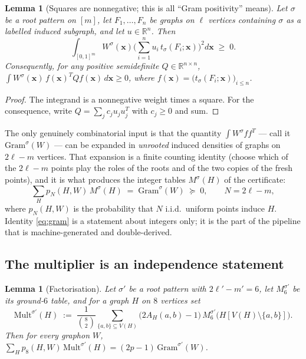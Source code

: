 \documentclass[11pt]{article}
\newtheorem{lemma}[theorem]{Lemma}
\theoremstyle{definition}
\newcommand{\R}{\mathbb R}
\begin{document}
\begin{lemma}[Squares are nonnegative; this is all ``Gram positivity'' means]
\label{lem:square}
Let $\sigma$ be a root pattern on $[m]$, let $F_1,\dots,F_n$ be graphs on
$\ell$ vertices containing $\sigma$ as a labelled induced subgraph, and let
$u\in\R^n$.  Then
\[
  \int_{[0,1]^m}W^\sigma(\mathbf x)
  \Big(\sum_{i=1}^{n}u_i\,t_\sigma(F_i;\mathbf x)\Big)^{\!2}d\mathbf x\;\ge\;0 .
\]
Consequently, for any positive semidefinite $Q\in\R^{n\times n}$,
$\int W^\sigma(\mathbf x)\,f(\mathbf x)^{T}Qf(\mathbf x)\,d\mathbf x\ge0$, where
$f(\mathbf x)=\big(t_\sigma(F_i;\mathbf x)\big)_{i\le n}$.
\end{lemma}

\begin{proof}
The integrand is a nonnegative weight times a square.  For the consequence,
write $Q=\sum_j c_j u_ju_j^{T}$ with $c_j\ge0$ and sum.
\end{proof}

The only genuinely combinatorial input is that the quantity
$\int W^\sigma f f^{T}$ --- call it $\mathrm{Gram}^\sigma(W)$ --- can be
expanded in \emph{unrooted} induced densities of graphs on $2\ell-m$ vertices.
That expansion is a finite counting identity (choose which of the $2\ell-m$
points play the roles of the roots and of the two copies of the fresh points),
and it is what produces the integer tables $M^\sigma(H)$ of the certificate:
\begin{equation}\label{eq:gram}
  \sum_{H}p_{N}(H,W)\,M^{\sigma}(H)\;=\;\mathrm{Gram}^{\sigma}(W)\;\succeq\;0,
  \qquad N=2\ell-m,
\end{equation}
where $p_N(H,W)$ is the probability that $N$ i.i.d.\ uniform points induce $H$.
Identity \eqref{eq:gram} is a statement about integers only; it is the part of
the pipeline that is machine-generated and double-derived.

\subsection{The multiplier is an independence statement}

\begin{lemma}[Factorisation]\label{lem:mult}
Let $\sigma'$ be a root pattern with $2\ell'-m'=6$, let $M^{\sigma'}_6$ be its
ground-$6$ table, and for a graph $H$ on $8$ vertices set
\[
  \mathrm{Mult}^{\sigma'}(H)\;:=\;\frac1{\binom82}\sum_{\{a,b\}\subseteq V(H)}
  \big(2A_H(a,b)-1\big)\,M^{\sigma'}_6\big(H[V(H)\setminus\{a,b\}]\big).
\]
Then for every graphon $W$,
$\sum_H p_8(H,W)\,\mathrm{Mult}^{\sigma'}(H)=(2p-1)\,\mathrm{Gram}^{\sigma'}(W)$.
\end{lemma}
\end{document}

